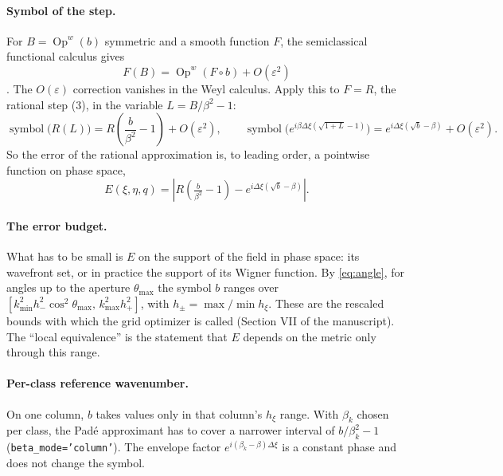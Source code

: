 \documentclass[11pt]{article}
\newcommand{\Op}{\operatorname{Op}^w}
\begin{document}
\paragraph{Symbol of the step.} For $B=\Op(b)$ symmetric and a smooth function
$F$, the semiclassical functional calculus gives
\begin{equation}\label{eq:funcalc}
F(B)=\Op\!\left(F\circ b\right)+O(\varepsilon^2)
\end{equation}
\cite{helffer,dimassi}. The $O(\varepsilon)$ correction vanishes in the Weyl
calculus. Apply this to $F=R$, the rational step (3), in the variable
$L=B/\beta^2-1$:
\[
\operatorname{symbol}\bigl(R(L)\bigr)=R\!\left(\frac{b}{\beta^2}-1\right)+O(\varepsilon^2),
\qquad
\operatorname{symbol}\bigl(e^{i\beta\Delta\xi(\sqrt{1+L}-1)}\bigr)=e^{i\Delta\xi(\sqrt b-\beta)}+O(\varepsilon^2).
\]
So the error of the rational approximation is, to leading order, a pointwise
function on phase space,
\[
E(\xi,\eta,q)=\left|R\!\left(\tfrac{b}{\beta^2}-1\right)-e^{i\Delta\xi(\sqrt b-\beta)}\right| .
\]

\paragraph{The error budget.} What has to be small is $E$ on the support of
the field in phase space: its wavefront set, or in practice the support of its
Wigner function. By \eqref{eq:angle}, for angles up to the aperture
$\theta_{\max}$ the symbol $b$ ranges over
$[k_{\min}^2h_-^2\cos^2\theta_{\max},\,k_{\max}^2h_+^2]$, with
$h_\pm=\max/\min h_\xi$. These are the rescaled bounds with which the grid
optimizer is called (Section VII of the manuscript). The ``local
equivalence'' is the statement that $E$ depends on the metric only through this
range.

\paragraph{Per-class reference wavenumber.} On one column, $b$ takes values only
in that column's $h_\xi$ range. With $\beta_k$ chosen per class, the Padé
approximant has to cover a narrower interval of $b/\beta_k^2-1$
(\texttt{beta\_mode='column'}). The envelope factor
$e^{i(\beta_k-\beta)\Delta\xi}$ is a constant phase and does not change the
symbol.
\end{document}
